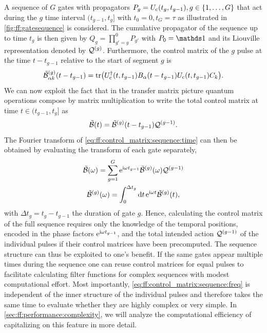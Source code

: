 A sequence of $G$ gates with propagators $P_g = U_{\mathrm{c}}(t_g, t_{g-1}), g\in\lbrace 1,\dotsc,G\rbrace$ that act during the $g$ time interval $(t_{g-1}, t_g]$ with $t_0 =  0, t_G = \tau$ as illustrated in \cref{fig:ff:gatesequence} is considered.
The cumulative propagator of the sequence up to time $t_g$ is then given by $Q_g = \prod_{g'=g}^0 P_{g'}$ with $P_0 = \eye$ and its Liouville representation denoted by $\mathcal{Q}^{(g)}$.
Furthermore, the control matrix of the $g$ pulse at the time $t - t_{g-1}$ relative to the start of segment $g$ is
\begin{equation}\label{eq:ff:control_matrix:pulse:time}
    \tilde{\mathcal{B}}^{(g)}_{\alpha k}(t - t_{g-1}) = \tr(U_{\mathrm{c}}^\dagger(t, t_{g-1})B_\alpha(t - t_{g-1}) U_{\mathrm{c}}(t, t_{g-1}) C_k).
\end{equation}
We can now exploit the fact that in the transfer matrix picture quantum operations compose by matrix multiplication to write the total control matrix at time $t\in (t_{g-1}, t_g]$ as
\begin{equation}\label{eq:ff:control_matrix:sequence:time}
    \tilde{\mathcal{B}}(t) = \tilde{\mathcal{B}}^{(g)}(t - t_{g-1})\mathcal{Q}^{(g-1)}.
\end{equation}
The Fourier transform of \cref{eq:ff:control_matrix:sequence:time} can then be obtained by evaluating the transform of each gate separately,
\begin{gather}
    \tilde{\mathcal{B}}(\omega) = \sum_{g = 1}^G \mathrm{e}^{\mathrm{i}\omega t_{g-1}}\tilde{\mathcal{B}}^{(g)}(\omega)\mathcal{Q}^{(g-1)} \label{eq:ff:control_matrix:sequence:freq}\\
    \tilde{\mathcal{B}}^{(g)}(\omega) = \int_0^{\Delta t_g}\dd{t}\mathrm{e}^{\mathrm{i}\omega t}\tilde{\mathcal{B}}^{(g)}(t), \label{eq:ff:control_matrix:pulse:freq}
\end{gather}
with $\Delta t_g = t_g - t_{g-1}$ the duration of gate $g$.
Hence, calculating the control matrix of the full sequence requires only the knowledge of the temporal positions, encoded in the phase factors $\mathrm{e}^{\mathrm{i}\omega t_{g-1}}$, and the total intended action $\mathcal{Q}^{(g-1)}$ of the individual pulses if their control matrices have been precomputed.
The sequence structure can thus be exploited to one's benefit.
If the same gates appear multiple times during the sequence one can reuse control matrices for equal pulses to facilitate calculating filter functions for complex sequences with modest computational effort.
Most importantly, \cref{eq:ff:control_matrix:sequence:freq} is independent of the inner structure of the individual pulses and therefore takes the same time to evaluate whether they are highly complex or very simple.
In \cref{sec:ff:performance:complexity}, we will analyze the computational efficiency of capitalizing on this feature in more detail.


